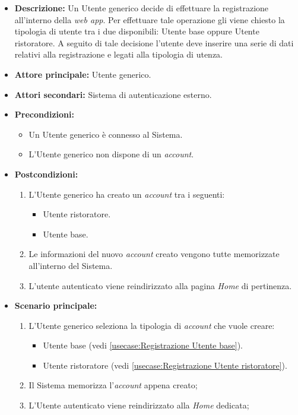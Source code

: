 \label{usecase:Effettua registrazione}

\begin{itemize}
	\item \textbf{Descrizione:} Un Utente generico decide di effettuare la registrazione all'interno della \textit{web app}. Per effettuare tale
	operazione gli viene chiesto la tipologia di utente tra i due disponibili: Utente base oppure Utente ristoratore. 
    A seguito di tale decisione l'utente deve inserire una serie di dati relativi alla registrazione e legati alla tipologia di utenza.

	\item \textbf{Attore principale:} Utente generico.
	\item \textbf{Attori secondari:} Sistema di autenticazione esterno.
	\item \textbf{Precondizioni:}
        \begin{itemize}
            \item Un Utente generico è connesso al Sistema.
            \item L'Utente generico non dispone di un \textit{account}.
        \end{itemize}
	\item \textbf{Postcondizioni:}
	    \begin{enumerate}
            \item L'Utente generico ha creato un \textit{account} tra i seguenti:
            \begin{itemize}
                \item Utente ristoratore.
                \item Utente base.
            \end{itemize}
            \item Le informazioni del nuovo \textit{account} creato vengono tutte memorizzate all'interno del Sistema.
            \item L'utente autenticato viene reindirizzato alla pagina \textit{Home} di pertinenza.
        \end{enumerate}


	\item \textbf{Scenario principale:}
	      \begin{enumerate}
		      \item L'Utente generico seleziona la tipologia di \textit{account} che vuole creare: 
		      \begin{itemize}
				\item Utente base (vedi \autoref{usecase:Registrazione Utente base}).
				\item Utente ristoratore (vedi \autoref{usecase:Registrazione Utente ristoratore}).
			  \end{itemize} 
              \item Il Sistema memorizza l'\textit{account} appena creato;
		      \item L'Utente autenticato viene reindirizzato alla \textit{Home} dedicata;	
	      \end{enumerate}
		

\end{itemize}
